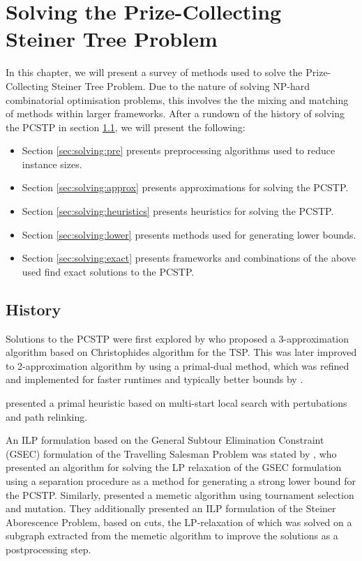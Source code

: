 \chapter{Solving the Prize-Collecting Steiner Tree Problem}
\label{chap:solving}

In this chapter, we will present a survey of methods used to solve the Prize-Collecting Steiner Tree Problem. Due to the nature of solving
NP-hard combinatorial optimisation problems, this involves the the mixing and matching of methods within larger frameworks.
 After a rundown of the history of solving the PCSTP in section \ref{sec:solving:history}, we will present the following:
\begin{itemize}
\item Section \ref{sec:solving:pre} presents preprocessing algorithms used to reduce instance sizes.
\item Section \ref{sec:solving:approx} presents approximations for solving the PCSTP.
\item Section \ref{sec:solving:heuristics} presents heuristics for solving the PCSTP.
\item Section \ref{sec:solving:lower} presents methods used for generating lower bounds.
\item Section \ref{sec:solving:exact} presents frameworks and combinations of the above used find exact solutions
   to the PCSTP.
\end{itemize}

\section{History}
\label{sec:solving:history}

Solutions to the PCSTP were first explored by \cite{Bienstock1993} who
proposed a 3-approximation algorithm based on Christophides algorithm for the TSP.
This was later improved to 2-approximation algorithm by
\cite{goemans1997primal} using a primal-dual method,
which was refined and implemented
for faster runtimes and typically better
bounds by \cite{Johnson:2000:PCS:338219.338637}.

\cite{canuto2001local} presented a primal heuristic based on multi-start
local search with pertubations and path relinking.

An ILP formulation based on the General Subtour Elimination Constraint (GSEC) formulation of the Travelling Salesman Problem was
stated by \cite{lucena2004strong}, who presented an algorithm for solving the LP relaxation of the GSEC formulation using
a separation procedure as a method for generating a strong lower bound for the PCSTP. Similarly, \cite{Ljubic:2004:memetic}
presented a memetic algorithm using tournament selection and mutation. They additionally presented an ILP formulation of the Steiner
 Aborescence Problem, based on cuts, the LP-relaxation of which was solved on a subgraph extracted from the memetic algorithm to
 improve the solutions as a postprocessing step.

